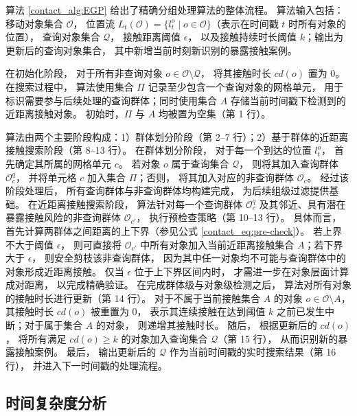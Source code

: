 算法 \ref{contact_alg:EGP} 给出了精确分组处理算法的整体流程。 算法输入包括：移动对象集合 $\mathcal{O}$， 位置流 $L_t(\mathcal{O})=\{l_t^o \mid o\in \mathcal{O}\}$（表示在时间戳 $t$ 时所有对象的位置）， 查询对象集合 $\mathcal{Q}$， 接触距离阈值 $\epsilon$， 以及接触持续时长阈值 $k$；输出为更新后的查询对象集合， 其中新增当前时刻新识别的暴露接触案例。

在初始化阶段， 对于所有非查询对象 $o \in \mathcal{O} \setminus \mathcal{Q}$， 将其接触时长 $cd(o)$ 置为 0。 在搜索过程中， 算法使用集合 $\Pi$ 记录至少包含一个查询对象的网格单元， 用于标识需要参与后续处理的查询群体；同时使用集合 $A$ 存储当前时间戳下检测到的近距离接触对象。 初始时，$\Pi$ 与 $A$ 均被置为空集（第 1 行）。

算法由两个主要阶段构成：1）群体划分阶段（第 2--7 行）；2）基于群体的近距离接触搜索阶段（第 8--13 行）。 在群体划分阶段， 对于每一个到达的位置 $l_t^o$， 首先确定其所属的网格单元 $c$。 若对象 $o$ 属于查询集合 $\mathcal{Q}$， 则将其加入查询群体 $\mathcal{O}_c^q$， 并将单元格 $c$ 加入集合 $\Pi$；否则， 将其加入对应的非查询群体 $\mathcal{O}_c$。 经过该阶段处理后， 所有查询群体与非查询群体均构建完成， 为后续组级过滤提供基础。 在近距离接触搜索阶段， 算法针对每一个查询群体 $\mathcal{O}_c^q$ 及其邻近、具有潜在暴露接触风险的非查询群体 $\mathcal{O}_{c'}$， 执行预检查策略（第 10--13 行）。 具体而言， 首先计算两群体之间距离的上下界（参见公式 \ref{contact_eq:pre-check}）。 若上界不大于阈值 $\epsilon$， 则可直接将 $\mathcal{O}_{c'}$ 中所有对象加入当前近距离接触集合 $A$；若下界大于 $\epsilon$， 则安全剪枝该非查询群体， 因为其中任一对象均不可能与查询群体中的对象形成近距离接触。 仅当 $\epsilon$ 位于上下界区间内时， 才需进一步在对象层面计算成对距离， 以完成精确验证。 在完成群体级与对象级检测之后， 算法对所有对象的接触时长进行更新（第 14 行）。 对于不属于当前接触集合 $A$ 的对象 $o \in \mathcal{O} \setminus A$， 其接触时长 $cd(o)$ 被重置为 0， 表示其连续接触在达到阈值 $k$ 之前已发生中断；对于属于集合 $A$ 的对象， 则递增其接触时长。 随后， 根据更新后的 $cd(o)$， 将所有满足 $cd(o) \geq k$ 的对象加入查询集合 $\mathcal{Q}$（第 15 行）， 从而识别新的暴露接触案例。 最后， 输出更新后的 $\mathcal{Q}$ 作为当前时间戳的实时搜索结果（第 16 行）， 并进入下一时间戳的处理流程。

\subsection{时间复杂度分析}

